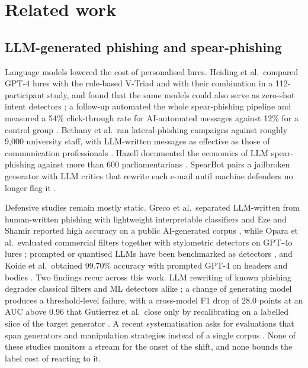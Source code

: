 \section{Related work}\label{sec:related}

\subsection{LLM-generated phishing and spear-phishing}
Language models lowered the cost of personalised lures. Heiding et al.\ compared GPT-4 lures with the rule-based V-Triad and with their combination in a 112-participant study, and found that the same models could also serve as zero-shot intent detectors \cite{heiding2024}; a follow-up automated the whole spear-phishing pipeline and measured a 54\% click-through rate for AI-automated messages against 12\% for a control group \cite{heiding2026}. Bethany et al.\ ran lateral-phishing campaigns against roughly 9{,}000 university staff, with LLM-written messages as effective as those of communication professionals \cite{bethany2025}. Hazell documented the economics of LLM spear-phishing against more than 600 parliamentarians \cite{hazell2023}. SpearBot pairs a jailbroken generator with LLM critics that rewrite each e-mail until machine defenders no longer flag it \cite{qi2025}.

Defensive studies remain mostly static. Greco et al.\ separated LLM-written from human-written phishing with lightweight interpretable classifiers \cite{greco2024} and Eze and Shamir reported high accuracy on a public AI-generated corpus \cite{eze2024}, while Opara et al.\ evaluated commercial filters together with stylometric detectors on GPT-4o lures \cite{opara2025}; prompted or quantised LLMs have been benchmarked as detectors \cite{zhang2025,thapa2025}, and Koide et al.\ obtained 99.70\% accuracy with prompted GPT-4 on headers and bodies \cite{koide2026}. Two findings recur across this work. LLM rewriting of known phishing degrades classical filters and ML detectors alike \cite{afane2024,thapa2025}; a change of generating model produces a threshold-level failure, with a cross-model F1 drop of 28.0 points at an AUC above 0.96 that Gutierrez et al.\ close only by recalibrating on a labelled slice of the target generator \cite{gutierrez2026}. A recent systematisation asks for evaluations that span generators and manipulation strategies instead of a single corpus \cite{chen2025sok}. None of these studies monitors a stream for the onset of the shift, and none bounds the label cost of reacting to it.

